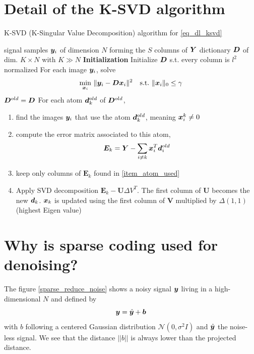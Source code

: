 \section{Detail of the K-SVD algorithm} \label{sec_ksvd}
\begin{algorithm}
    \caption{K-SVD (K-Singular Value Decomposition) algorithm for \eqref{eq_dl_ksvd}} \label{alg_ksvd}
  \begin{algorithmic}[1]
    \Input signal samples $\bm{y}_i$ of dimension $N$ forming the $S$ columns of $\bm{Y}$
    \Output dictionary $\bm{D}$ of dim. $K \times N$ with $K \gg N$
    \State \textbf{Initialization} Initialize $\bm{D}$ s.t. every column is $l^2$ normalized
	\State For each image $\bm{y}_i$, solve  \label{alg_ksvd_sparse_coding}
		\begin{align*}
			\quad \min_{\bm{x}_i}~ & \lVert \bm{y}_i-\bm{D}\bm{x}_i\rVert^2 \quad \text{s.t.}~ \lVert \bm{x}_i \rVert_0 \le \gamma
		\end{align*}
	\State $\bm{D}^{old} = \bm{D}$
	\State For each atom $\bm{d}_k^{old}$ of $\bm{D}^{old}$,  \label{alg_ksvd_dict_update}
	\begin{enumerate}[leftmargin=15mm,label=(\alph*)]
		\item find the images $\bm{y}_i$ that use the atom $\bm{d}_k^{old}$, meaning $\bm{x}_i^k \ne 0$ \label{item_atom_used}
		\item compute the error matrix associated to this atom,
		\begin{align*}
			\bm{E}_k = \bm{Y}-\sum_{i\ne k} \bm{x}_i^T\bm{d}_i^{old}
		\end{align*}
		\item keep only columns of $\bm{E}_k$ found in \ref{item_atom_used}
		\item Apply SVD decomposition $\bm{E}_k - \bm{U} \Delta V^T$. The first column of $\bm{U}$ becomes the new $\bm{d}_k$. $\bm{x}_k$ is updated using the first column of $\bm{V}$ multiplied by $\Delta(1,1)$ (highest Eigen value)
	\end{enumerate}
    \EndWhile
  \end{algorithmic}
\end{algorithm}

\section{Why is sparse coding used for denoising?}

The figure \ref{sparse_reduce_noise} shows a noisy signal $\bm{y}$ living in a high-dimensional $N$ and defined by
$$\bm{y}=\hat{\bm{y}} + \bm{b}$$
with $b$ following a centered Gaussian distribution $\mathcal{N}(0,\sigma^2I)$ and $\hat{\bm{y}}$ the noise-less signal. We see that the distance $||b||$ is always lower than the projected distance.

